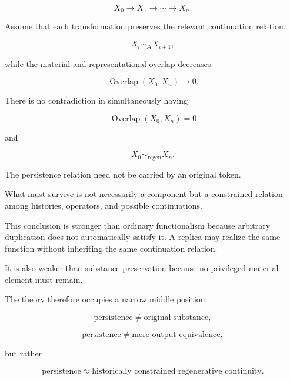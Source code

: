 \documentclass[11pt]{article}
\theoremstyle{remark}
\newcommand{\Adm}{\mathcal{A}}
\begin{document}
\begin{equation}
X_0
\rightarrow
X_1
\rightarrow
\cdots
\rightarrow
X_n.
\end{equation}

Assume that each transformation preserves the relevant continuation relation,

\begin{equation}
X_i
\sim_{\Adm}
X_{i+1},
\end{equation}

while the material and representational overlap decreases:

\begin{equation}
\operatorname{Overlap}(X_0,X_n)
\rightarrow 0.
\end{equation}

There is no contradiction in simultaneously having

\begin{equation}
\operatorname{Overlap}(X_0,X_n)=0
\end{equation}

and

\begin{equation}
X_0
\sim_{\mathrm{regen}}
X_n.
\end{equation}

The persistence relation need not be carried by an original token.

What must survive is not necessarily a component but a constrained relation among histories, operators, and possible continuations.

This conclusion is stronger than ordinary functionalism because arbitrary duplication does not automatically satisfy it. A replica may realize the same function without inheriting the same continuation relation.

It is also weaker than substance preservation because no privileged material element must remain.

The theory therefore occupies a narrow middle position:

\begin{equation}
\text{persistence}
\neq
\text{original substance},
\end{equation}

\begin{equation}
\text{persistence}
\neq
\text{mere output equivalence},
\end{equation}

but rather

\begin{equation}
\boxed{
\text{persistence}
\approx
\text{historically constrained regenerative continuity}.
}
\end{equation}
\end{document}
